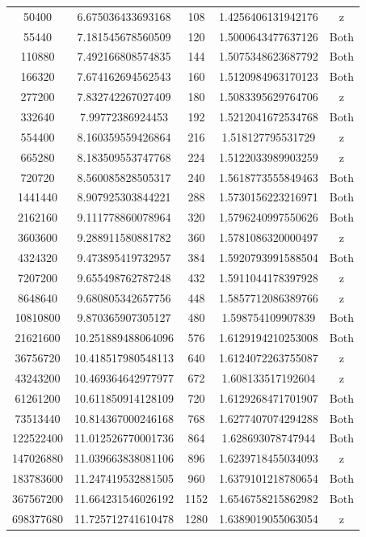 \documentclass{article}
\begin{document}
\begin{center}
\begin{tabular}{ |c|c|c|c|c| }
50400 &	 6.675036433693168 &	 108 & 1.4256406131942176 & z\\
55440 &	7.181545678560509 & 120 & 1.5000643477637126 & Both\\	
110880 & 7.492166808574835 & 144 & 1.5075348623687792 &Both \\	
166320 &7.674162694562543 &160 & 1.5120984963170123 & Both\\	
277200 & 7.832742267027409 &180 & 1.5083395629764706 & z \\ 	
332640 & 7.99772386924453& 192 & 1.5212041672534768	& Both\\ 
554400 & 8.160359559426864 & 216& 1.518127795531729 & z\\
665280 & 8.183509553747768 & 224 & 1.5122033989903259 & z\\ 
720720 &8.560085828505317 & 240 &  1.5618773555849463 & Both\\	
1441440 & 8.907925303844221& 288 & 1.5730156223216971 & Both\\	
2162160	& 9.111778860078964 & 320& 1.5796240997550626 &  Both\\
3603600	& 9.288911580881782	& 360& 1.5781086320000497 & z\\	
4324320	& 9.473895419732957	& 384 & 1.5920793991588504 & Both	\\
7207200	& 9.655498762787248	&  432 & 1.5911044178397928	& z\\
8648640	& 9.680805342657756	& 448 & 1.5857712086389766 & z\\	
10810800 &9.870365907305127	& 480 & 1.598754109907839 & Both \\ 21621600 & 10.251889488064096 & 576	& 1.6129194210253008 & Both\\
36756720 & 10.418517980548113 & 640 & 1.6124072263755087 & z \\
43243200 & 10.469364642977977 &  672 &  1.608133517192604 & z\\	
61261200 & 10.611850914128109 & 720 & 1.6129268471701907 & Both\\	
73513440 &	10.814367000246168 & 768& 1.6277407074294288 & Both\\
122522400 &	11.012526770001736 & 864 & 1.628693078747944 & Both	\\
147026880 & 11.039663838081106 & 896 & 1.6239718455034093 & z\\	
183783600 & 11.247419532881505 & 960 & 1.6379101218780654 & Both\\	
367567200 & 11.664231546026192 & 1152 & 1.6546758215862982 & Both\\	
698377680 & 11.725712741610478 & 1280 & 1.6389019055063054 & z \\	
 \hline
\end{tabular}
\end{center}
\end{document}
